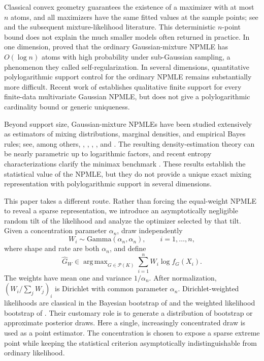 \documentclass[11pt]{article}
\theoremstyle{definition}
\theoremstyle{remark}
\DeclareMathOperator*{\argmax}{arg\,max}
\newcommand{\Pcal}{\mathcal P}
\newcommand{\Ghat}{\widehat G}
\begin{document}
Classical convex geometry guarantees the existence of a maximizer with at
most $n$ atoms, and all maximizers have the same fitted values at the sample
points; see \citet{lindsay1983geometry} and the subsequent mixture-likelihood
literature.  This deterministic $n$-point bound does not explain the much
smaller models often returned in practice.  In one dimension,
\citet{polyanskiywu2020} proved that the ordinary Gaussian-mixture NPMLE has
$O(\log n)$ atoms with high probability under sub-Gaussian sampling, a
phenomenon they called self-regularization.  In several dimensions,
quantitative polylogarithmic support control for the ordinary NPMLE remains
substantially more difficult.  Recent work of \citet{wang2026} establishes
qualitative finite support for every finite-data multivariate Gaussian NPMLE,
but does not give a polylogarithmic cardinality bound or generic uniqueness.

Beyond support size, Gaussian-mixture NPMLEs have been studied extensively as
estimators of mixing distributions, marginal densities, and empirical Bayes
rules; see, among others, \citet{laird1978}, \citet{koenkermizera2014},
\citet{zhang2009}, \citet{sahaguntuboyina2020}, and
\citet{soloffetal2025}.  The resulting density-estimation theory can be nearly
parametric up to logarithmic factors, and recent entropy characterizations
clarify the minimax benchmark \citep{jiaetal2023}.  These results establish the
statistical value of the NPMLE, but they do not provide a unique exact mixing
representation with polylogarithmic support in several dimensions.

This paper takes a different route.  Rather than forcing the equal-weight
NPMLE to reveal a sparse representation, we introduce an asymptotically
negligible random tilt of the likelihood and analyze the optimizer selected by
that tilt.  Given a concentration parameter $\alpha_n$, draw independently
\[
 W_i\sim\mathrm{Gamma}(\alpha_n,\alpha_n),
 \qquad i=1,\ldots,n,
\]
where shape and rate are both $\alpha_n$, and define
\begin{equation}\label{eq:rrnpmle-intro}
 \Ghat_W\in\argmax_{G\in\Pcal(K)}
       \sum_{i=1}^n W_i\log f_G(X_i).
\end{equation}
The weights have mean one and variance $1/\alpha_n$.  After normalization,
$(W_i/\sum_jW_j)_i$ is Dirichlet with common parameter $\alpha_n$.
Dirichlet-weighted likelihoods are classical in the Bayesian bootstrap of
\citet{rubin1981} and the weighted likelihood bootstrap of
\citet{newtonraftery1994}.  Their customary role is to generate a distribution
of bootstrap or approximate posterior draws.  Here a single, increasingly
concentrated draw is used as a point estimator.  The concentration is chosen
to expose a sparse extreme point while keeping the statistical criterion
asymptotically indistinguishable from ordinary likelihood.
\end{document}
